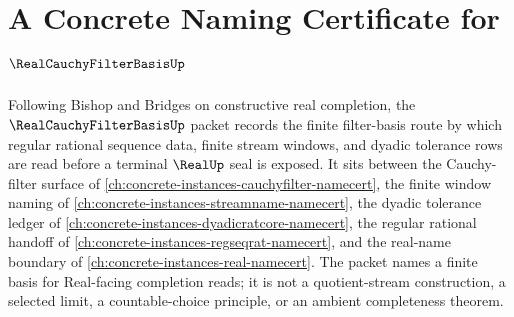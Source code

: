 \chapter{A Concrete Naming Certificate for $\RealCauchyFilterBasisUp$}
\label{ch:concrete-instances-real-cauchy-filter-basis-namecert}

Following Bishop and Bridges on constructive real completion, the $\RealCauchyFilterBasisUp$ packet records the finite filter-basis route by which regular rational sequence data, finite stream windows, and dyadic tolerance rows are read before a terminal $\RealUp$ seal is exposed. It sits between the Cauchy-filter surface of \autoref{ch:concrete-instances-cauchyfilter-namecert}, the finite window naming of \autoref{ch:concrete-instances-streamname-namecert}, the dyadic tolerance ledger of \autoref{ch:concrete-instances-dyadicratcore-namecert}, the regular rational handoff of \autoref{ch:concrete-instances-regseqrat-namecert}, and the real-name boundary of \autoref{ch:concrete-instances-real-namecert}. The packet names a finite basis for Real-facing completion reads; it is not a quotient-stream construction, a selected limit, a countable-choice principle, or an ambient completeness theorem.

